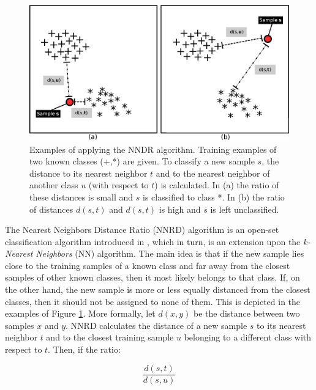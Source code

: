 \begin{figure}[t]
	\begin{center}
    	\includegraphics[scale=0.70]{Figures/NNDR_diagrams.eps}
		\caption{Examples of applying the NNDR algorithm. Training examples of two known classes (+,*) are given. To classify a new sample $s$, the distance to its nearest neighbor $t$ and to the nearest neighbor of another class $u$ (with respect to $t$) is calculated. In (a) the ratio of these distances is small and $s$ is classified to class *.  In (b) the ratio of distances $d(s,t)$ and $d(s,t)$ is high and $s$ is left unclassified.}
		\label{chap:openset:fig:NNDR_single_decision}
	\end{center}
\end{figure}

The Nearest Neighbors Distance Ratio (NNRD) algorithm is an open-set classification algorithm introduced in \parencite{mendesjunior2016}, which in turn, is an extension upon the \textit{k-Nearest Neighbors} (NN) algorithm. The main idea is that if the new sample lies close to the training samples of a known class and far away from the closest samples of other known classes, then it most likely belongs to that class. If, on the other hand, the new sample is more or less equally distanced from the closest classes, then it should not be assigned to none of them. This is depicted in the examples of Figure \ref{chap:openset:fig:NNDR_single_decision}. More formally, let $d(x,y)$ be the distance between two samples $x$ and $y$. NNRD calculates the distance of a new sample $s$ to its nearest neighbor $t$ and to the closest training sample $u$ belonging to a different class with respect to $t$. Then, if the ratio: 

\begin{equation}
    \frac{d(s,t)}{d(s,u)}
\end{equation}

